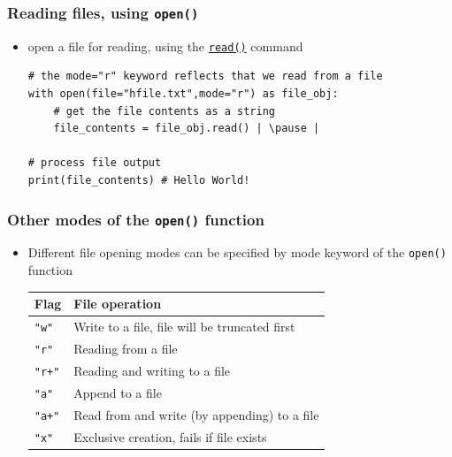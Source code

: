 \documentclass[xcolor=table]{beamer}
\begin{document}
\begin{frame}[fragile]
    \frametitle{Reading files, using \texttt{open()}}
\begin{itemize}
    \item open a file for reading, using the \href{https://docs.python.org/3/library/io.html#io.TextIOBase.read}{\texttt{read()}} command \pause
\begin{lstlisting}[style=python]
# the mode="r" keyword reflects that we read from a file
with open(file="hfile.txt",mode="r") as file_obj:
    # get the file contents as a string
    file_contents = file_obj.read() | \pause |

# process file output
print(file_contents) # Hello World!
\end{lstlisting}
\end{itemize}
\end{frame}


\begin{frame}[fragile]
    \frametitle{Other modes of the \texttt{open()} function}
\begin{itemize}
    \item Different file opening modes can be specified by mode keyword of the {\texttt{open()}} function \pause 
\begin{center}
    \begin{tabular}{|l|l|}\hline
        Flag & File operation \\ \hline
        \texttt{"w"}
    & Write to a file, file will be truncated first \\
        \texttt{"r"} & Reading from a file \\
        \texttt{"r+"} & Reading and writing to a file \\
        \texttt{"a"} & Append to a file \\
        \texttt{"a+"} & Read from and write (by appending) to a file \\
        \texttt{"x"} & Exclusive creation, fails if file exists \\ \hline
    \end{tabular}
\end{center}
\end{itemize}
\end{frame}
\end{document}

